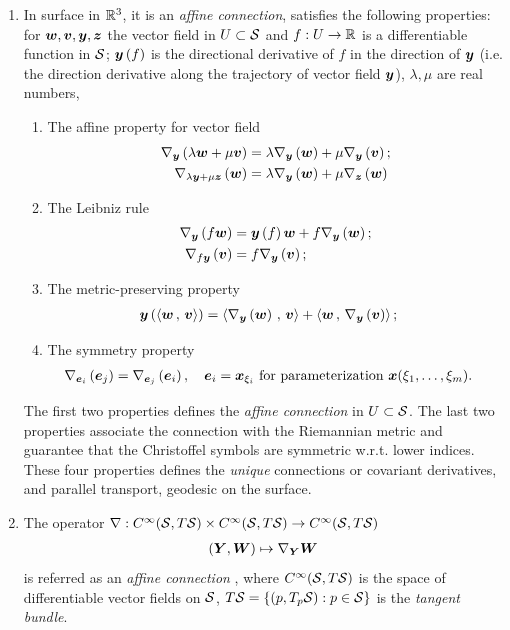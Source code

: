 \documentclass[11pt]{article}
\begin{document}
\begin{enumerate}
\item In surface in ${\mathbb R}^{3}$, it is an \emph{affine connection}, satisfies the following properties: for $\boldsymbol{w}, \boldsymbol{v}, \boldsymbol{y}, \boldsymbol{z}$ the vector field in $U\subset {\mathcal S}$ and $f: U \rightarrow {\mathbb R}$ is a differentiable function in ${\mathcal S}$; $\boldsymbol{y}\left(f\right)$ is the directional derivative of $f$ in the direction of $\boldsymbol{y}$ (i.e. the direction derivative along the trajectory of vector field $\boldsymbol{y}$), $\lambda, \mu$ are real numbers, 
\begin{enumerate}
\item The affine property for vector field 
 \begin{align*}
\nabla_{\boldsymbol{y}}\left(\lambda\boldsymbol{w}+ \mu\boldsymbol{v}\right) &= \lambda\nabla_{\boldsymbol{y}}\left(\boldsymbol{w}\right)+ \mu\nabla_{\boldsymbol{y}}\left(\boldsymbol{v}\right); \\
\nabla_{\lambda\boldsymbol{y}+ \mu\boldsymbol{z}}\left(\boldsymbol{w}\right) &= \lambda\nabla_{\boldsymbol{y}}\left(\boldsymbol{w}\right)+ \mu\nabla_{\boldsymbol{z}}\left(\boldsymbol{w}\right)
\end{align*}
\item The Leibniz rule
 \begin{align*}
\nabla_{\boldsymbol{y}}\left(f\boldsymbol{w}\right) &= \boldsymbol{y}\left(f\right)\boldsymbol{w}+ f\nabla_{\boldsymbol{y}}\left(\boldsymbol{w}\right);\\
 \nabla_{f\boldsymbol{y}}\left(\boldsymbol{v}\right) &=  f\nabla_{\boldsymbol{y}}\left(\boldsymbol{v}\right);
\end{align*}
\item The metric-preserving property
\begin{align*}
\boldsymbol{y}\left(\left\langle \boldsymbol{w}\,,\, \boldsymbol{v} \right\rangle\right) &= \left\langle \nabla_{\boldsymbol{y}}\left(\boldsymbol{w}\right)\,,\, \boldsymbol{v} \right\rangle + \left\langle \boldsymbol{w}\,,\, \nabla_{\boldsymbol{y}}\left(\boldsymbol{v}\right) \right\rangle;
\end{align*}
\item The symmetry property
\begin{align*}
\nabla_{\boldsymbol{e}_{i}}\left(\boldsymbol{e}_{j}\right) &= \nabla_{\boldsymbol{e}_{j}}\left(\boldsymbol{e}_{i}\right), \quad \boldsymbol{e}_{i} = \boldsymbol{x}_{\xi_{i}}\text{ for parameterization }\boldsymbol{x}(\xi_{1},\ldots, \xi_{m}).
\end{align*}
\end{enumerate}
The first two properties defines the \emph{affine connection} in $U\subset {\mathcal S}$. The last two properties associate the connection with the Riemannian metric and guarantee that the Christoffel symbols are symmetric w.r.t. lower indices.  These four properties defines the \emph{unique} connections or covariant derivatives, and parallel transport, geodesic on the surface. \\

\item The operator $\nabla: C^{\infty}({\mathcal S}, T{\mathcal S}) \times C^{\infty}({\mathcal S}, T{\mathcal S})\rightarrow C^{\infty}({\mathcal S}, T{\mathcal S})$ 
\begin{align*}
(\boldsymbol{Y}, \boldsymbol{W})\mapsto \nabla_{\boldsymbol{Y}}\boldsymbol{W}
\end{align*} is referred as an \emph{affine connection} \citep{do1992riemannian, murray1993differential}, where $C^{\infty}({\mathcal S}, T{\mathcal S})$ is the space of differentiable vector fields on ${\mathcal S}$, $T{\mathcal S} = \left\{(p,T_{p}{\mathcal S}): p\in {\mathcal S}\right\}$ is the \emph{tangent bundle}.


\end{enumerate}
\end{document}

